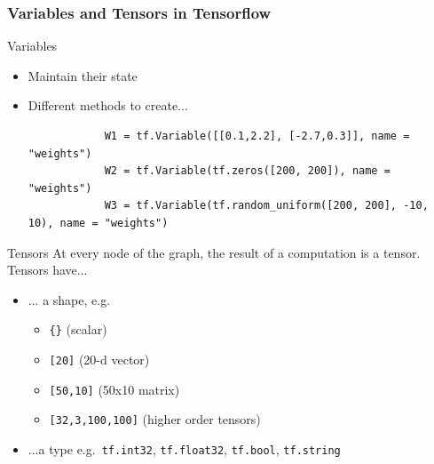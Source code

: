 \documentclass[mathserif]{beamer}
\begin{document}
\begin{frame}[fragile]
	\frametitle{Variables and Tensors in Tensorflow}
	\begin{block}{Variables}
		\begin{itemize}
			\item Maintain their state\\
			\item Different methods to create... 
			\begin{verbatim}
			W1 = tf.Variable([[0.1,2.2], [-2.7,0.3]], name = "weights")
			W2 = tf.Variable(tf.zeros([200, 200]), name = "weights")
			W3 = tf.Variable(tf.random_uniform([200, 200], -10, 10), name = "weights")			
			\end{verbatim}
		\end{itemize}
	\end{block}
	\begin{block}{Tensors}
		At every node of the graph, the result of a computation is a tensor.\\

		Tensors have...
		\begin{itemize}
			\item ... a shape, e.g.
			\begin{itemize}
				\item\texttt{\{\}} (scalar)
				\item\texttt{[20]} (20-d vector)
				\item\texttt{[50,10]} (50x10 matrix)
				\item\texttt{[32,3,100,100]} (higher order tensors)
			\end{itemize}
			\item ...a type e.g.\ \texttt{tf.int32}, \texttt{tf.float32}, \texttt{tf.bool}, \texttt{tf.string}
		\end{itemize}
	\end{block}
\end{frame}
\end{document}
